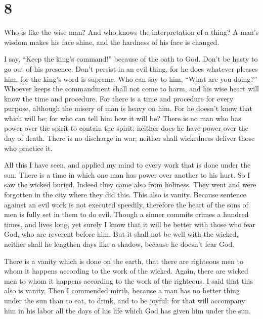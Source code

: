 \hypertarget{section-7}{%
\section{8}\label{section-7}}

 Who is like the wise man? And who knows the
interpretation of a thing? A man's wisdom makes his face shine, and the
hardness of his face is changed.

 I say, ``Keep the king's command!'' because of the oath
to God.  Don't be hasty to go out of his presence. Don't
persist in an evil thing, for he does whatever pleases him,
 for the king's word is supreme. Who can say to him,
``What are you doing?''  Whoever keeps the commandment
shall not come to harm, and his wise heart will know the time and
procedure.  For there is a time and procedure for every
purpose, although the misery of man is heavy on him.  For
he doesn't know that which will be; for who can tell him how it will be?
 There is no man who has power over the spirit to contain
the spirit; neither does he have power over the day of death. There is
no discharge in war; neither shall wickedness deliver those who practice
it.

 All this I have seen, and applied my mind to every work
that is done under the sun. There is a time in which one man has power
over another to his hurt.  So I saw the wicked buried.
Indeed they came also from holiness. They went and were forgotten in the
city where they did this. This also is vanity.  Because
sentence against an evil work is not executed speedily, therefore the
heart of the sons of men is fully set in them to do evil.
 Though a sinner commits crimes a hundred times, and
lives long, yet surely I know that it will be better with those who fear
God, who are reverent before him.  But it shall not be
well with the wicked, neither shall he lengthen days like a shadow,
because he doesn't fear God.

 There is a vanity which is done on the earth, that there
are righteous men to whom it happens according to the work of the
wicked. Again, there are wicked men to whom it happens according to the
work of the righteous. I said that this also is vanity. 
Then I commended mirth, because a man has no better thing under the sun
than to eat, to drink, and to be joyful: for that will accompany him in
his labor all the days of his life which God has given him under the
sun.

